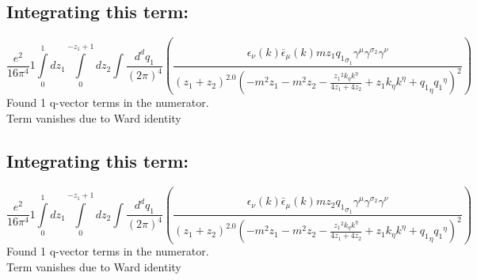 \subsection*{Integrating this term:}
\begin{dmath}\frac{e^{2}}{16 \pi^{4}}1\int\limits_{ 0 }^{ 1 } d{ z_{ 1 } }\int\limits_{ 0 }^{ - { z_{ 1 } } + 1 } d{ z_{ 2 } }\int\frac{d^d q_1 }{ (2\pi)^4 }\left(\frac{\epsilon_{ \nu }({ k }) \bar{\epsilon}_{ \mu }({ k }) m { z_{ 1 } } { { q_1 }_{ \sigma_1 } } { \gamma^{ \mu } } { \gamma^{ \sigma_2 } } { \gamma^{ \nu } }}{\left({ z_{ 1 } } + { z_{ 2 } }\right)^{2.0} \left(- m^{2} { z_{ 1 } } - m^{2} { z_{ 2 } } - \frac{{ z_{ 1 } }^{2} { { k }_{ \eta } } { { k }^{ \eta } }}{4 { z_{ 1 } } + 4 { z_{ 2 } }} + { z_{ 1 } } { { k }_{ \eta } } { { k }^{ \eta } } + { { q_1 }_{ \eta } } { { q_1 }^{ \eta } }\right)^{2}}\right)\end{dmath}
Found 1 q-vector terms in the numerator.\\
Term vanishes due to Ward identity\\
\subsection*{Integrating this term:}
\begin{dmath}\frac{e^{2}}{16 \pi^{4}}1\int\limits_{ 0 }^{ 1 } d{ z_{ 1 } }\int\limits_{ 0 }^{ - { z_{ 1 } } + 1 } d{ z_{ 2 } }\int\frac{d^d q_1 }{ (2\pi)^4 }\left(\frac{\epsilon_{ \nu }({ k }) \bar{\epsilon}_{ \mu }({ k }) m { z_{ 2 } } { { q_1 }_{ \sigma_1 } } { \gamma^{ \mu } } { \gamma^{ \sigma_2 } } { \gamma^{ \nu } }}{\left({ z_{ 1 } } + { z_{ 2 } }\right)^{2.0} \left(- m^{2} { z_{ 1 } } - m^{2} { z_{ 2 } } - \frac{{ z_{ 1 } }^{2} { { k }_{ \eta } } { { k }^{ \eta } }}{4 { z_{ 1 } } + 4 { z_{ 2 } }} + { z_{ 1 } } { { k }_{ \eta } } { { k }^{ \eta } } + { { q_1 }_{ \eta } } { { q_1 }^{ \eta } }\right)^{2}}\right)\end{dmath}
Found 1 q-vector terms in the numerator.\\
Term vanishes due to Ward identity\\
